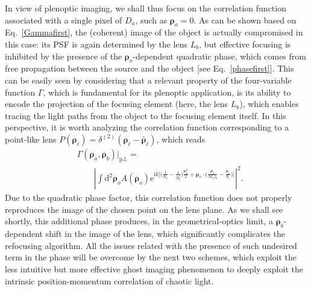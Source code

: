 \documentclass[aps,pra,amssymb,twocolumn,amsmath,superscriptaddress,showpacs,10pt]{revtex4-1}
\def\e{\mathrm{e}}
\def\d{\mathrm{d}}
\def\i{\mathrm{i}}
\begin{document}
In view of plenoptic imaging, we shall thus focus on the correlation function associated with a single pixel of $D_a$, such as $\bm{\rho}_a=0$. As can be shown based on Eq.~\eqref{Gammafirst}, the (coherent) image of the object is actually compromised in this case: its PSF is again determined by the lens $L_b$, but effective focusing is inhibited by the presence of the $\bm{\rho}_o$-dependent quadratic phase, which comes from free propagation between the source and the object  [see Eq.~\eqref{phasefirst}]. This can be easily seen by considering that a relevant property of the four-variable function $\Gamma$, which is fundamental for its plenoptic application, is its ability to encode the projection of the focusing element (here, the lens $L_b$), which enables tracing the light paths from the object to the focusing element itself. In this perspective, it is worth analyzing the correlation function corresponding to a point-like lens $P(\bm{\rho}_{\ell})=\delta^{(2)}(\bm{\rho}_{\ell}-\bar{\bm{\rho}}_{\ell})$, which reads
\begin{align}
& \Gamma(\bm{\rho}_a,\bm{\rho}_b)\bigl|_{\mathrm{p.l.}} = \nonumber \\
& \qquad \!\left| \!\int\!\d^2\bm{\rho}_o A(\bm{\rho}_o) \e^{\i k \bigl[ \bigl( \frac{1}{S_2} - \frac{1}{S_2^f} \bigr) \frac{\bm{\rho}_o^2}{2} + \bm{\rho}_o\cdot \bigl(\frac{\bm{\rho}_a}{M_s z_b} - \frac{\bar{\bm{\rho}}_{\ell}}{S_1} \bigr)\bigr] } \!\right|^2\!.
\end{align}  
Due to the quadratic phase factor, this correlation function does not properly reproduces the image of the chosen point on the lens plane. As we shall see shortly, this additional phase produces, in the geometrical-optics limit, a $\bm{\rho}_b$-dependent shift in the image of the lens, which significantly complicates the refocusing algorithm. All the issues related with the presence of such undesired term in the phase will be overcome by the next two schemes, which exploit the less intuitive but more effective ghost imaging phenomenon \cite{laserphys,valencia,scarcelliPRL} to deeply exploit the intrinsic position-momentum correlation of chaotic light.
\end{document}
